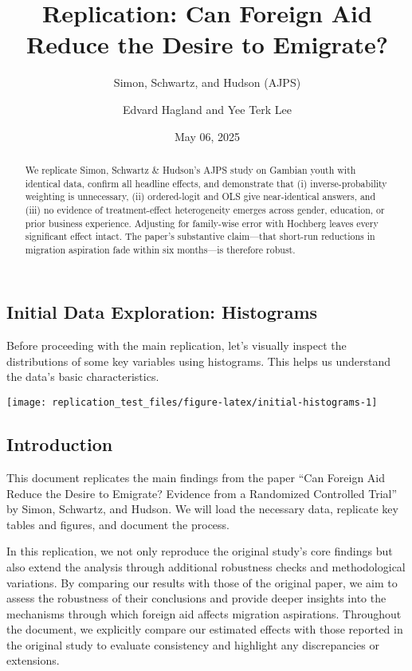 \documentclass[
]{article}
\title{Replication: Can Foreign Aid Reduce the Desire to Emigrate?}
\subtitle{Simon, Schwartz, and Hudson (AJPS)}
\author{Edvard Hagland and Yee Terk Lee}
\date{May 06, 2025}
\begin{document}
\maketitle
\begin{abstract}
We replicate Simon, Schwartz \& Hudson's AJPS study on Gambian youth
with identical data, confirm all headline effects, and demonstrate that
(i) inverse-probability weighting is unnecessary, (ii) ordered-logit and
OLS give near-identical answers, and (iii) no evidence of
treatment-effect heterogeneity emerges across gender, education, or
prior business experience. Adjusting for family-wise error with Hochberg
leaves every significant effect intact. The paper's substantive
claim---that short-run reductions in migration aspiration fade within
six months---is therefore robust.
\end{abstract}

\subsection{Initial Data Exploration:
Histograms}\label{initial-data-exploration-histograms}

Before proceeding with the main replication, let's visually inspect the
distributions of some key variables using histograms. This helps us
understand the data's basic characteristics.

\begin{center}\texttt{[image: replication\_test\_files/figure-latex/initial-histograms-1]} \end{center}

\subsection{Introduction}\label{introduction}

This document replicates the main findings from the paper ``Can Foreign
Aid Reduce the Desire to Emigrate? Evidence from a Randomized Controlled
Trial'' by Simon, Schwartz, and Hudson. We will load the necessary data,
replicate key tables and figures, and document the process.

In this replication, we not only reproduce the original study's core
findings but also extend the analysis through additional robustness
checks and methodological variations. By comparing our results with
those of the original paper, we aim to assess the robustness of their
conclusions and provide deeper insights into the mechanisms through
which foreign aid affects migration aspirations. Throughout the
document, we explicitly compare our estimated effects with those
reported in the original study to evaluate consistency and highlight any
discrepancies or extensions.
\end{document}
